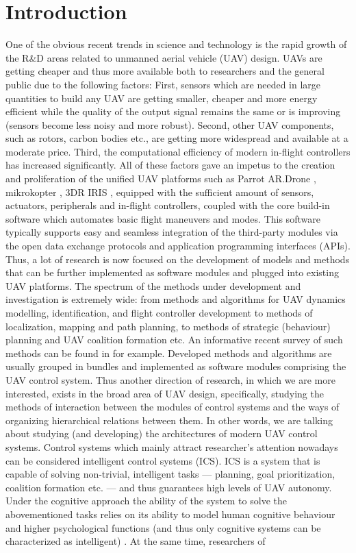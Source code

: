 \documentclass[review]{elsarticle}
\begin{document}
\linenumbers

\section{Introduction}\label{sec:intro}

One of the obvious recent trends in science and technology is the rapid growth of the R\&D areas related to unmanned aerial vehicle (UAV) design. UAVs are getting cheaper and thus more available both to researchers and the general public due to the following factors: First, sensors which are needed in large quantities to build any UAV are getting smaller, cheaper and more energy efficient while the quality of the output signal remains the same or is improving (sensors become less noisy and more robust). Second, other UAV components, such as rotors, carbon bodies etc., are getting more widespread and available at a moderate price. Third, the computational efficiency of modern in-flight controllers has increased significantly. All of these factors gave an impetus to the creation and proliferation of the unified UAV platforms such as Parrot AR.Drone \cite{ArDrone,Bristeau2011}, mikrokopter \cite{mikrokopter}, 3DR IRIS \cite{3dr}, equipped with the sufficient amount of sensors, actuators, peripherals and in-flight controllers, coupled with the core build-in software which automates basic flight maneuvers and modes. This software typically supports easy and seamless integration of the third-party modules via the open data exchange protocols and application programming interfaces (APIs). Thus, a lot of research is now focused on the development of models and methods that can be further implemented as software modules and plugged into existing UAV platforms. The spectrum of the methods under development and investigation is extremely wide: from methods and algorithms for UAV dynamics modelling, identification, and flight controller development to methods of localization, mapping and path planning, to methods of strategic (behaviour) planning and UAV coalition formation etc. An informative recent survey of such methods can be found in \cite{Kendoul2012} for example. Developed methods and algorithms are usually grouped in bundles and implemented as software modules comprising the UAV control system. Thus another direction of research, in which we are more interested, exists in the broad area of UAV design, specifically, studying the methods of interaction between the modules of control systems and the ways of organizing hierarchical relations between them. In other words, we are talking about studying (and developing) the architectures of modern UAV control systems. Control systems which mainly attract researcher's attention nowadays can be considered intelligent control systems \cite{Albus2002} (ICS). ICS is a system that is capable of solving non-trivial, intelligent tasks --- planning, goal prioritization, coalition formation etc. --- and thus guarantees high levels of UAV autonomy. Under the cognitive approach the ability of the system to solve the abovementioned tasks relies on its ability to model human cognitive behaviour and higher psychological functions (and thus only cognitive systems can be characterized as intelligent) \cite{Kurup2012}. At the same time, researchers of 
\end{document}
